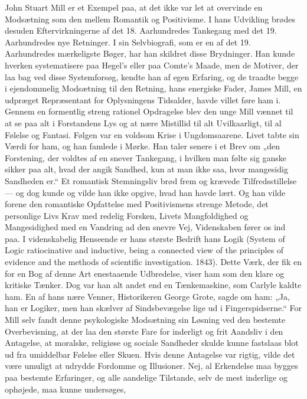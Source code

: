 \documentclass[12pt,a4paper,openany]{book}
\newcommand{\opage}[1]{\marginnote{\footnotesize\textit{[#1]}}}
\begin{document}
John Stuart Mill er et Exempel paa, at det ikke var let at overvinde
en Modsætning som den mellem Romantik og Positivisme. I
hans Udvikling brødes desuden Eftervirkningerne af det 18. Aarhundredes
Tankegang med det 19. Aarhundredes nye Retninger. I
sin Selvbiografi, som er en af det 19. Aarhundredes mærkeligste Bøger,
har han skildret disse Brydninger. Han kunde hverken systematisere
paa Hegel’s eller paa Comte’s Maade, men de Motiver, der
laa bag ved disse Systemforsøg, kendte han af egen Erfaring, og de
traadte begge i ejendommelig Modsætning til den Retning, hans
energiske Fader, James Mill, en udpræget Repræsentant for Oplysningens
Tidsalder, havde villet føre ham i. Gennem en formentlig
streng rationel Opdragelse blev den unge Mill vænnet til at se paa
alt i Forstandens Lys og at nære Mistillid til alt Uvilkaarligt, til al
Følelse og Fantasi. Følgen var en voldsom Krise i Ungdomsaarene.
Livet tabte sin Værdi for ham, og han famlede i Mørke. Han taler
senere i et Brev om „den Forstening, der voldtes af en snever Tankegang,
i hvilken man følte sig ganske sikker paa alt, hvad der
angik Sandhed, kun at man ikke saa, hvor mangesidig Sandheden
er.“ Et romantisk Stemningsliv brød frem og krævede Tilfredsstillelse
--- og dog kunde og vilde han ikke opgive, hvad han havde
lært. Og han vilde forene den romantiske Opfattelse med Positivismens
strenge Metode, det personlige Livs Krav med redelig Forsken,
Livets Mangfoldighed og Mangesidighed med en Vandring ad den
snevre Vej, Videnskaben fører os ind paa.
I videnskabelig Henseende er hans største Bedrift hans Logik (System
of Logic ratiocinative and inductive, being a connected view
of the principles of evidence and the methods of scientific investigation.
1843). Dette Værk, der fik en for en Bog af denne Art enestaaende
Udbredelse, viser ham som den klare og kritiske Tænker.
\opage{21}Dog var han alt andet end en Tænkemaskine, som Carlyle kaldte
ham. En af hans nære Venner, Historikeren George Grote, sagde om
ham: „Ja, han er Logiker, men han skælver af Sindsbevægelse lige
ud i Fingerspidserne.“ For Mill selv fandt denne psykologiske Modsætning
sin Løsning ved den bestemte Overbevisning, at der laa den
største Fare for inderligt og frit Aandsliv i den Antagelse, at moralske,
religiøse og sociale Sandheder skulde kunne fastslaas blot ud
fra umiddelbar Følelse eller Skuen. Hvis denne Antagelse var rigtig,
vilde det være umuligt at udrydde Fordomme og Illusioner. Nej, al
Erkendelse maa bygges paa bestemte Erfaringer, og alle aandelige
Tilstande, selv de mest inderlige og ophøjede, maa kunne undersøges,
\end{document}
